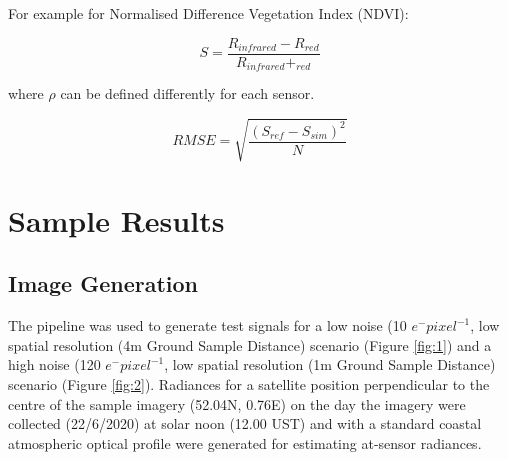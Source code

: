 \documentclass[10pt,a4paper,final,twocolumn]{article}
\begin{document}
For example for Normalised Difference Vegetation Index (NDVI):

\begin{equation}
S = \frac{R_{infrared} - R_{red}}{R_{infrared} + _{red}}
\end{equation}

where $\rho$ can be defined differently for each sensor.

\begin{equation}
RMSE = \sqrt{\frac{(S_{ref}-S_{sim})^{2}}{N}}
\end{equation}

\section{Sample Results}
\subsection{Image Generation}
The pipeline was used to generate test signals for a low noise (10 $e^- pixel ^{-1}$, low spatial resolution (4m Ground Sample Distance) scenario (Figure \ref{fig:1}) and  a high noise (120 $e^- pixel ^{-1}$, low spatial resolution (1m Ground Sample Distance) scenario (Figure \ref{fig:2}). Radiances for a satellite position perpendicular to the centre of the sample imagery (52.04N, 0.76E) on the day the imagery were collected (22/6/2020) at solar noon (12.00 UST) and with a standard coastal atmospheric optical profile were generated for estimating at-sensor radiances.

\begin{figure*}
\caption{Sample simulated signals (4m GSD, dark noise=10) using a pipeline based on Sentinel-2 VNIR bands and a CCD sensor. The input hyperspectral (A), simulated RGB (B), Predicted false colour NIR (C), Normalised Difference Vegetation Index (D) are shown as images and example input reflectance spectra (E) and example simulated reflectance spectra (F) are shown as line plots. }
\label{fig:1}
\end{figure*}

\begin{figure*}
\caption{Sample simulated signals (1m GSD, dark noise=120) using a pipeline based on Sentinel-2 VNIR bands and a CCD sensor. The input hyperspectral (A), simulated RGB (B), Predicted false colour NIR (C), Normalised Difference Vegetation Index (D) are shown as images and example input reflectance spectra (E) and example simulated reflectance spectra (F) are shown as line plots. }
\label{fig:2}
\end{figure*}
\end{document}
